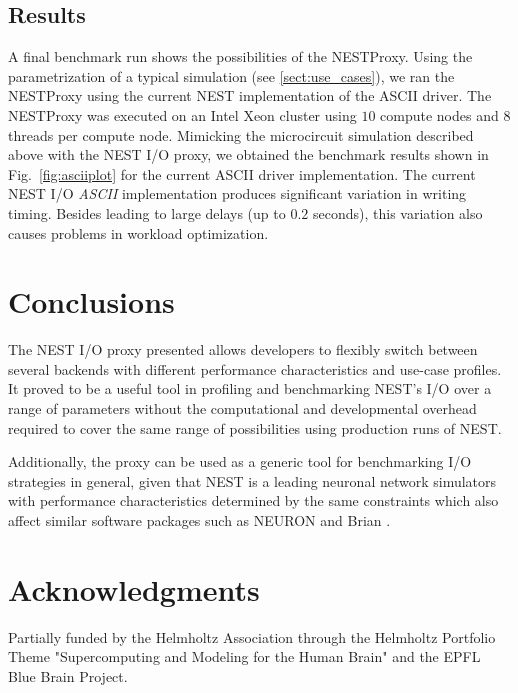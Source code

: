 \documentclass[]{YIC2015}
\begin{document}
\subsection{Results}

A final benchmark run shows the possibilities of the NESTProxy.  Using
the parametrization of a typical simulation (see
\ref{sect:use_cases}), we ran the NESTProxy using the current NEST
implementation of the ASCII driver.
The NESTProxy was executed on an Intel Xeon cluster using $10$ compute
nodes and $8$ threads per compute node. Mimicking the microcircuit
simulation described above with the NEST I/O proxy, we obtained the
benchmark results shown in Fig.~\ref{fig:asciiplot} for the current
ASCII driver implementation. The current NEST I/O \emph{ASCII}
implementation produces significant variation in writing timing.
Besides leading to large delays (up to $0.2$ seconds), this variation
also causes problems in workload optimization.

\section{Conclusions}

The NEST I/O proxy presented allows developers to flexibly switch
between several backends with different performance characteristics
and use-case profiles. It proved to be a useful tool in profiling and
benchmarking NEST's I/O over a range of parameters without the
computational and developmental overhead required to cover the same
range of possibilities using production runs of NEST.

Additionally, the proxy can be used as a generic tool for benchmarking
I/O strategies in general, given that NEST is a leading neuronal
network simulators with performance characteristics determined by the
same constraints which also affect similar software packages such as
NEURON \cite{neuron} and Brian \cite{brian}.

\section*{Acknowledgments}

Partially funded by the Helmholtz Association through the Helmholtz
Portfolio Theme "Supercomputing and Modeling for the Human Brain" and the EPFL Blue Brain Project.
\end{document}
